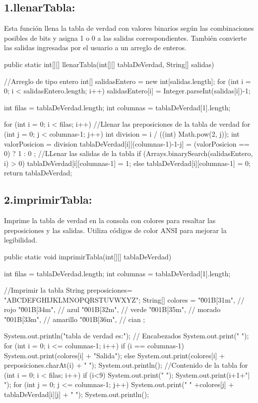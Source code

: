 \documentclass{IEEEcsmag}
\begin{document}
\subsection{1.llenarTabla:}
Esta función llena la tabla de verdad con valores binarios según las combinaciones posibles de bits y asigna 1 o 0 a las salidas correspondientes. También convierte las salidas ingresadas por el usuario a un arreglo de enteros.
\begin{javaCode}
public static int[][] llenarTabla(int[][] tablaDeVerdad, String[] salidas){
    //Arreglo de tipo entero
    int[] salidasEntero = new int[salidas.length];
    for (int i = 0; i < salidasEntero.length; i++) {
        salidasEntero[i] = Integer.parseInt(salidas[i])-1;
    }
    
    int filas = tablaDeVerdad.length;
    int columnas = tablaDeVerdad[1].length;
    
    for (int i = 0; i < filas; i++) {
        //Llenar las preposiciones de la tabla de verdad
        for (int j = 0; j < columnas-1; j++) {
            int division = i / ((int) Math.pow(2, j));
            int valorPosicion = division %
            tablaDeVerdad[i][(columnas-1)-1-j] = (valorPosicion == 0)   ?   1 : 0 ;
        }
        //LLenar las salidas de la tabla
        if (Arrays.binarySearch(salidasEntero, i) > 0) {
            tablaDeVerdad[i][columnas-1] = 1;
        } else {
            tablaDeVerdad[i][columnas-1] = 0;
        }
    }
    return tablaDeVerdad;
}
\end{javaCode}

\subsection{2.imprimirTabla:}
Imprime la tabla de verdad en la consola con colores para resaltar las preposiciones y las salidas. Utiliza códigos de color ANSI para mejorar la legibilidad.
\begin{javaCode}
public static void imprimirTabla(int[][] tablaDeVerdad){
    int filas = tablaDeVerdad.length;
    int columnas = tablaDeVerdad[1].length;
    
    //Imprimir la tabla
    String preposiciones= "ABCDEFGHIJKLMNOPQRSTUVWXYZ";
    String[] colores = {
        "\u001B[31m", // rojo
        "\u001B[34m", // azul
        "\u001B[32m", // verde
        "\u001B[35m", // morado
        "\u001B[33m", // amarillo
        "\u001B[36m", // cian
    };
    
    System.out.println("\nLa tabla de verdad es:");
    // Encabezados
    System.out.print("     ");
    for (int i = 0; i <= columnas-1; i++) {
        if (i == columnas-1) {
            System.out.print(colores[i] + "Salida");
        }else{
            System.out.print(colores[i] + preposiciones.charAt(i) + "  ");
        }
    }
    System.out.println();
    //Contenido de la tabla
    for (int i = 0; i < filas; i++) {
        if (i<9) {
            System.out.print(" ");
        }
        System.out.print(i+1+"| ");
        for (int j = 0; j <= columnas-1; j++) {
            System.out.print(" " +colores[j] + tablaDeVerdad[i][j] + " ");
        }
        System.out.println();
    }
}
\end{javaCode}
\end{document}
